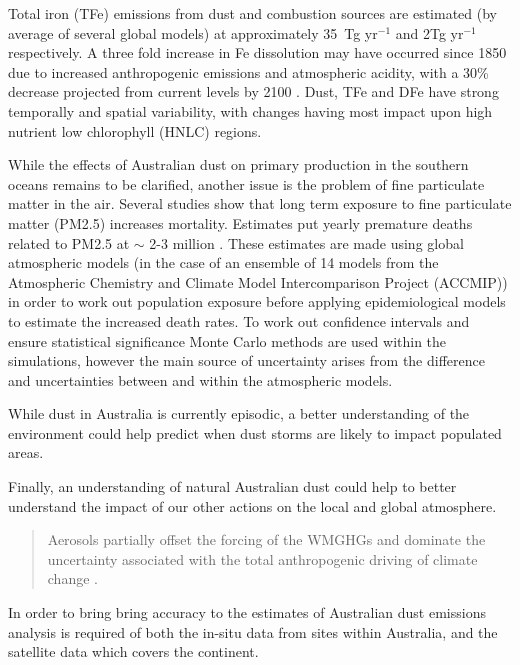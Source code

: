 Total iron (TFe) emissions from dust and combustion sources are estimated (by average of several global models) at approximately 35~Tg yr$^{-1}$ and 2Tg yr$^{-1}$ respectively. A three fold increase in Fe dissolution may have occurred since 1850 due to increased anthropogenic emissions and atmospheric acidity, with a 30\% decrease projected from current levels by 2100 \cite{Myriokefalitakis_2015}.
Dust, TFe and DFe have strong temporally and spatial variability, with changes having most impact upon high nutrient low chlorophyll (HNLC) regions.

While the effects of Australian dust on primary production in the southern oceans remains to be clarified, another issue is the problem of fine particulate matter in the air.
Several studies show that long term exposure to fine particulate matter (PM2.5) increases mortality. 
Estimates put yearly premature deaths related to PM2.5 at $\sim$ 2-3 million \cite{Hoek_2013, 19627030, Silva_2013, Lelieveld_2015}.   
These estimates are made using global atmospheric models (in the case of \citet{Silva_2013} an ensemble of 14 models from the Atmospheric Chemistry and Climate Model Intercomparison Project (ACCMIP)) in order to work out population exposure before applying epidemiological models to estimate the increased death rates.
To work out confidence intervals and ensure statistical significance Monte Carlo methods are used within the simulations, however the main source of uncertainty arises from the difference and uncertainties between and within the atmospheric models.

While dust in Australia is currently episodic, a better understanding of the environment could help predict when dust storms are likely to impact populated areas.

Finally, an understanding of natural Australian dust could help to better understand the impact of our other actions on the local and global atmosphere. 
\begin{quote}
Aerosols partially offset the forcing of the WMGHGs and dominate the uncertainty associated with the total anthropogenic driving of climate change \cite{IPCC_2013_chap8}.
\end{quote}
In order to bring bring accuracy to the estimates of Australian dust emissions analysis is required of both the in-situ data from sites within Australia, and the satellite data which covers the continent.